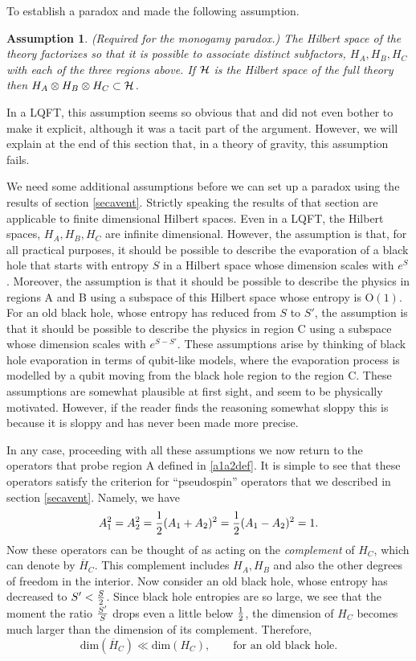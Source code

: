 \documentclass[12pt]{article}
\def\hilbfull{{\cal H}}
\def\Or[#1]{{\text{O}}\left({#1}\right)}
\newcommand{\be}{\begin{equation}}
\newcommand{\ee}{\end{equation}}
\newtheorem*{wrongassumption}{Assumption}
\begin{document}
To establish a paradox \cite{Mathur:2009hf} and \cite{Almheiri:2012rt} made the following assumption.
\begin{wrongassumption}{(Required for the monogamy paradox.)}
The Hilbert space of the theory
factorizes so that it is possible to associate distinct subfactors, $H_{A}, H_{B}, H_{C}$ with each of the three regions above. If $\hilbfull$ is the Hilbert space of the full theory then $H_{A} \otimes H_{B} \otimes H_{C} \subset \hilbfull$.
\end{wrongassumption}
In a LQFT, this assumption seems so obvious  that  \cite{Mathur:2009hf} and \cite{Almheiri:2012rt} did not even bother to make it explicit, although it was a tacit part of the argument. However, we will explain at the end of this section that, in a theory of gravity, this assumption fails.


We need some additional assumptions before we can set up a paradox using the results of section \ref{secavent}. Strictly speaking the results of that section are applicable to finite dimensional Hilbert spaces. Even in a LQFT, the Hilbert spaces, $H_{A}, H_{B}, H_{C}$ are infinite dimensional. However, the assumption is that, for all practical purposes, it should be possible to describe the evaporation of a black hole that starts with entropy $S$ in a Hilbert space whose dimension scales with $e^{S}$. Moreover, the assumption is that it should be possible to describe the physics in regions A and B using a subspace of this Hilbert space whose entropy is $\Or[1]$. For an old black hole, whose entropy has reduced from $S$ to $S'$, the assumption is that it should be possible to describe the physics in region C using a subspace whose dimension scales with $e^{S - S'}$. These assumptions arise
by thinking of black hole evaporation in terms of qubit-like models, where the evaporation process is modelled by
a qubit moving from the black hole region to the region C. These assumptions are somewhat plausible at first sight, and seem to be physically motivated. However, if the reader finds the reasoning somewhat sloppy this is because it is sloppy and has never been made more precise.

In any case, proceeding with all these assumptions we now return to the operators that probe region A defined in \eqref{a1a2def}.  It is simple to see that these operators satisfy the criterion for ``pseudospin'' operators that we described in section \ref{secavent}. Namely, we have
\be
A_1^2 = A_2^2 = {1 \over 2} (A_1 + A_2)^2 = {1 \over 2} (A_1 - A_2)^2 = 1.
\ee
Now these operators can be thought of as acting on the {\em complement} of $H_{C}$, which can denote by $\overline{H}_C$.  This complement includes $H_{A}, H_{B}$ and also the other degrees of freedom in the interior. Now consider an  old black hole, whose entropy has decreased to $S' < {S \over 2}$. Since black hole entropies are so large, we see that the moment the ratio ${S' \over S}$ drops even a little below ${1 \over 2}$,   the dimension of $H_{C}$ becomes much larger than the dimension of its complement. Therefore,
\be
\text{dim}(\overline{H}_C) \ll \text{dim}(H_C), \qquad \text{for~an~old~black~hole}.
\ee
\end{document}
